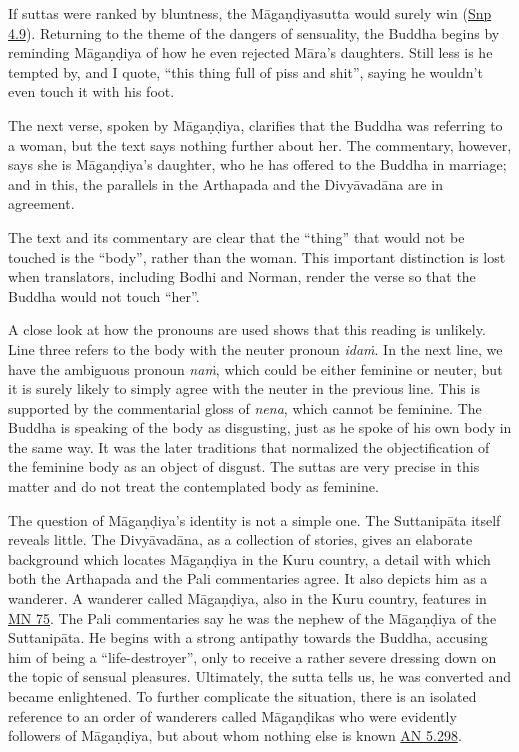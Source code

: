 \documentclass[12pt,openany]{book}%
\begin{document}
If suttas were ranked by bluntness, the \textsanskrit{Māgaṇḍiyasutta} would surely win (\href{https://suttacentral.net/snp4.9/en/sujato}{Snp 4.9}). Returning to the theme of the dangers of sensuality, the Buddha begins by reminding \textsanskrit{Māgaṇḍiya} of how he even rejected \textsanskrit{Māra}’s daughters. Still less is he tempted by, and I quote, “this thing full of piss and shit”, saying he wouldn’t even touch it with his foot.

The next verse, spoken by \textsanskrit{Māgaṇḍiya}, clarifies that the Buddha was referring to a woman, but the text says nothing further about her. The commentary, however, says she is \textsanskrit{Māgaṇḍiya}’s daughter, who he has offered to the Buddha in marriage; and in this, the parallels in the Arthapada and the \textsanskrit{Divyāvadāna} are in agreement.

The text and its commentary are clear that the “thing” that would not be touched is the “body”, rather than the woman. This important distinction is lost when translators, including Bodhi and Norman, render the verse so that the Buddha would not touch “her”.

A close look at how the pronouns are used shows that this reading is unlikely. Line three refers to the body with the neuter pronoun \textit{\textsanskrit{idaṁ}}. In the next line, we have the ambiguous pronoun \textit{\textsanskrit{naṁ}}, which could be either feminine or neuter, but it is surely likely to simply agree with the neuter in the previous line. This is supported by the commentarial gloss of \textit{nena}, which cannot be feminine. The Buddha is speaking of the body as disgusting, just as he spoke of his own body in the same way. It was the later traditions that normalized the objectification of the feminine body as an object of disgust. The suttas are very precise in this matter and do not treat the contemplated body as feminine.

The question of \textsanskrit{Māgaṇḍiya}’s identity is not a simple one. The \textsanskrit{Suttanipāta} itself reveals little. The \textsanskrit{Divyāvadāna}, as a collection of stories, gives an elaborate background which locates \textsanskrit{Māgaṇḍiya} in the Kuru country, a detail with which both the Arthapada and the Pali commentaries agree. It also depicts him as a wanderer. A wanderer called \textsanskrit{Māgaṇḍiya}, also in the Kuru country, features in \href{https://suttacentral.net/mn75/en/sujato}{MN 75}. The Pali commentaries say he was the nephew of the \textsanskrit{Māgaṇḍiya} of the \textsanskrit{Suttanipāta}. He begins with a strong antipathy towards the Buddha, accusing him of being a “life-destroyer”, only to receive a rather severe dressing down on the topic of sensual pleasures. Ultimately, the sutta tells us, he was converted and became enlightened. To further complicate the situation, there is an isolated reference to an order of wanderers called \textsanskrit{Māgaṇḍikas} who were evidently followers of \textsanskrit{Māgaṇḍiya}, but about whom nothing else is known \href{https://suttacentral.net/an5.298/en/sujato}{AN 5.298}.
\end{document}
